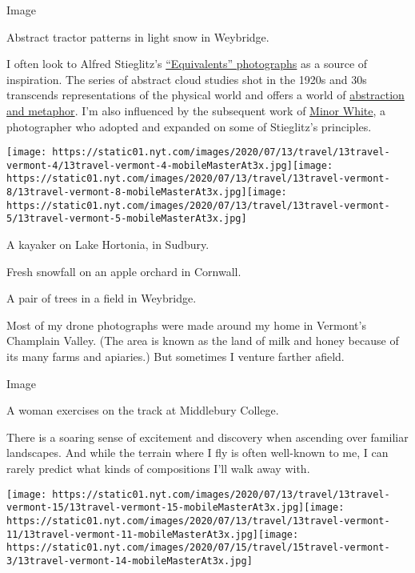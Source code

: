 Image

Abstract tractor patterns in light snow in Weybridge.

I often look to Alfred Stieglitz's
\href{https://archive.artic.edu/stieglitz/equivalents/}{``Equivalents''
photographs} as a source of inspiration. The series of abstract cloud
studies shot in the 1920s and 30s transcends representations of the
physical world and offers a world of
\href{https://www.nytimes.com/1983/02/13/arts/photography-view-stieglitz-felt-the-pull-of-two-cultures.html}{abstraction
and metaphor}. I'm also influenced by the subsequent work of
\href{https://www.nytimes.com/1995/01/27/arts/photography-review-before-the-artist-became-a-mystic.html}{Minor
White}, a photographer who adopted and expanded on some of Stieglitz's
principles.

\texttt{[image: https://static01.nyt.com/images/2020/07/13/travel/13travel-vermont-4/13travel-vermont-4-mobileMasterAt3x.jpg]}\texttt{[image: https://static01.nyt.com/images/2020/07/13/travel/13travel-vermont-8/13travel-vermont-8-mobileMasterAt3x.jpg]}\texttt{[image: https://static01.nyt.com/images/2020/07/13/travel/13travel-vermont-5/13travel-vermont-5-mobileMasterAt3x.jpg]}

A kayaker on Lake Hortonia, in Sudbury.

Fresh snowfall on an apple orchard in Cornwall.

A pair of trees in a field in Weybridge.

Most of my drone photographs were made around my home in Vermont's
Champlain Valley. (The area is known as the land of milk and honey
because of its many farms and apiaries.) But sometimes I venture farther
afield.

Image

A woman exercises on the track at Middlebury College.

There is a soaring sense of excitement and discovery when ascending over
familiar landscapes. And while the terrain where I fly is often
well-known to me, I can rarely predict what kinds of compositions I'll
walk away with.

\texttt{[image: https://static01.nyt.com/images/2020/07/13/travel/13travel-vermont-15/13travel-vermont-15-mobileMasterAt3x.jpg]}\texttt{[image: https://static01.nyt.com/images/2020/07/13/travel/13travel-vermont-11/13travel-vermont-11-mobileMasterAt3x.jpg]}\texttt{[image: https://static01.nyt.com/images/2020/07/15/travel/15travel-vermont-3/13travel-vermont-14-mobileMasterAt3x.jpg]}

